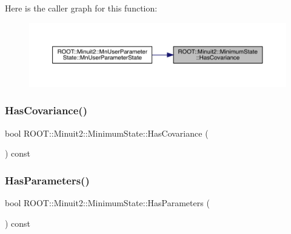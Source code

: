 Here is the caller graph for this function\+:
\nopagebreak
\begin{figure}[H]
\begin{center}
\leavevmode
\includegraphics[width=350pt]{db/dcd/classROOT_1_1Minuit2_1_1MinimumState_aba1e55d52217a591657dba0cc9fa8c9c_icgraph}
\end{center}
\end{figure}
\mbox{\label{classROOT_1_1Minuit2_1_1MinimumState_aba1e55d52217a591657dba0cc9fa8c9c}} 
\subsubsection{\texorpdfstring{HasCovariance()}{HasCovariance()}\hspace{0.1cm}{\footnotesize\ttfamily [3/3]}}
{\footnotesize\ttfamily bool R\+O\+O\+T\+::\+Minuit2\+::\+Minimum\+State\+::\+Has\+Covariance (\begin{DoxyParamCaption}{ }\end{DoxyParamCaption}) const\hspace{0.3cm}{\ttfamily [inline]}}

\mbox{\label{classROOT_1_1Minuit2_1_1MinimumState_a5871d5838abf68982d9e2ed7a66ea5c3}} 
\subsubsection{\texorpdfstring{HasParameters()}{HasParameters()}\hspace{0.1cm}{\footnotesize\ttfamily [1/3]}}
{\footnotesize\ttfamily bool R\+O\+O\+T\+::\+Minuit2\+::\+Minimum\+State\+::\+Has\+Parameters (\begin{DoxyParamCaption}{ }\end{DoxyParamCaption}) const\hspace{0.3cm}{\ttfamily [inline]}}

